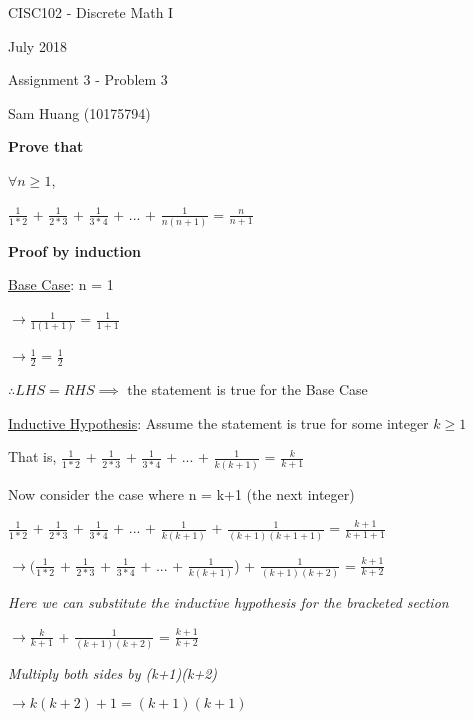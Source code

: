 \documentclass{report}
\begin{document}
    CISC102 - Discrete Math I

    July 2018

    \bigskip
    
    Assignment 3 - Problem 3
    
    Sam Huang (10175794)
    \bigskip
    
    
    \centerline{\textbf{Prove that}}
    
    $\forall n \geq 1$, 
    
    $\frac{1}{1*2}$ + $\frac{1}{2*3}$ + $\frac{1}{3*4}$ + ... + $\frac{1}{n(n+1)}$ = $\frac{n}{n+1}$
    
    \bigskip
    \bigskip
    
    \centerline{\textbf{Proof by induction}}
     
    \underline{Base Case}: n = 1
    
    $\rightarrow \frac{1}{1(1+1)}$ = $\frac{1}{1+1}$
    
    $\rightarrow \frac{1}{2}$ = $\frac{1}{2}$
    
    \medskip
    
    $\therefore LHS = RHS \implies$ the statement is true for the Base Case
    
    \bigskip
    
    \underline{Inductive Hypothesis}: Assume the statement is true for some integer $k \geq 1$
    
    That is, $\frac{1}{1*2}$ + $\frac{1}{2*3}$ + $\frac{1}{3*4}$ + ... + $\frac{1}{k(k+1)}$ = $\frac{k}{k+1}$
    
    \medskip
    
    Now consider the case where n = k+1 (the next integer) 
    
    $\frac{1}{1*2}$ + $\frac{1}{2*3}$ + $\frac{1}{3*4}$ + ... + $\frac{1}{k(k+1)}$ + $\frac{1}{(k+1)(k+1+1)}$ = $\frac{k+1}{k+1+1}$
    
    \medskip
    
    $\rightarrow (\frac{1}{1*2}$ + $\frac{1}{2*3}$ + $\frac{1}{3*4}$ + ... + $\frac{1}{k(k+1)}$) + $\frac{1}{(k+1)(k+2)}$ = $\frac{k+1}{k+2}$
    
    \textit{Here we can substitute the inductive hypothesis for the bracketed section}
    
    $\rightarrow \frac{k}{k+1}$ + $\frac{1}{(k+1)(k+2)}$ = $\frac{k+1}{k+2}$
    
    \textit{Multiply both sides by (k+1)(k+2)}
    
    $\rightarrow k(k+2) + 1 = (k+1)(k+1)$
    
\end{document}
